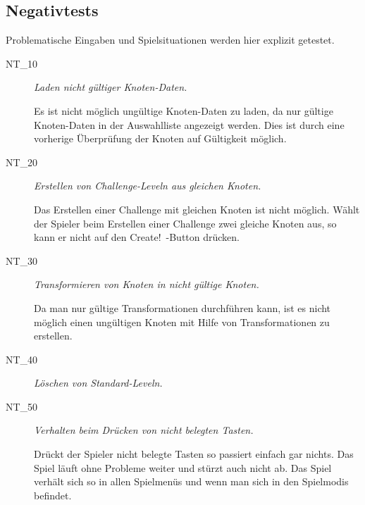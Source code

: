 %



\newpage



\label{Abschnitt:Tests:Protokoll:Negativ}



\subsection*{Negativtests}

Problematische Eingaben und Spielsituationen werden hier explizit getestet.\\

\begin{description}

	\item[NT\_10] \textit{Laden nicht gültiger Knoten-Daten.} \hfill\\
	
	\label{NT:10}
	
	Es ist nicht möglich ungültige Knoten-Daten zu laden, da nur gültige Knoten-Daten in der Auswahlliste angezeigt werden. Dies ist durch eine vorherige Überprüfung der Knoten auf Gültigkeit  möglich.
	
	\item[NT\_20] \textit{Erstellen von Challenge-Leveln aus gleichen Knoten.} \hfill\\
	
	\label{NT:20}
	
	Das Erstellen einer Challenge mit gleichen Knoten ist nicht möglich. Wählt der Spieler beim Erstellen einer Challenge zwei gleiche Knoten aus, so kann er nicht auf den \glqq Create!\grqq~-Button drücken.
	
	
	
	\item[NT\_30] \textit{Transformieren von Knoten in nicht gültige Knoten.} \hfill\\
	
	\label{NT:30}
	
	Da man nur gültige Transformationen durchführen kann, ist es nicht möglich einen ungültigen Knoten mit Hilfe von Transformationen zu erstellen.
	
	\item[NT\_40] \textit{Löschen von Standard-Leveln.} \hfill\\
	
	\label{NT:40}
	
	\item[NT\_50] \textit{Verhalten beim Drücken von nicht belegten Tasten.} \hfill\\
	
	\label{NT:50}	
	
	Drückt der Spieler nicht belegte Tasten so passiert einfach gar nichts. Das Spiel läuft ohne Probleme weiter und stürzt auch nicht ab. Das Spiel verhält sich so in allen Spielmenüs und wenn man sich in den Spielmodis befindet. 
	
\end{description}





